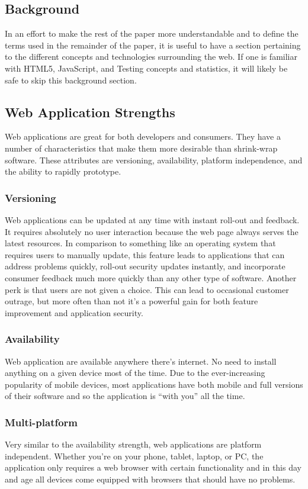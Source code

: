 \documentclass[11pt]{article}
\begin{document}
\begin{multicols}{2}
\section{Background}
In an effort to make the rest of the paper more understandable and to define the terms used in the remainder of the paper, it is useful to have a section pertaining to the different concepts and technologies surrounding the web.
If one is familiar with HTML5, JavaScript, and Testing concepts and statistics, it will likely be safe to skip this background section.

\subsection{Web Application Strengths}
Web applications are great for both developers and consumers. They have a number of characteristics that make them more desirable than shrink-wrap software. These attributes are versioning, availability, platform independence, and the ability to rapidly prototype.

\subsubsection{Versioning}
Web applications can be updated at any time with instant roll-out and feedback. It requires absolutely no user interaction because the web page always serves the latest resources. In comparison to something like an operating system that requires users to manually update, this feature leads to applications that can address problems quickly, roll-out security updates instantly, and incorporate consumer feedback much more quickly than any other type of software. Another perk is that users are not given a choice. This can lead to occasional customer outrage, but more often than not it's a powerful gain for both feature improvement and application security.

\subsubsection{Availability}
Web application are available anywhere there's internet. No need to install anything on a given device most of the time. Due to the ever-increasing popularity of mobile devices, most applications have both mobile and full versions of their software and so the application is ``with you'' all the time.

\subsubsection{Multi-platform}
Very similar to the availability strength, web applications are platform independent. Whether you're on your phone, tablet, laptop, or PC, the application only requires a web browser with certain functionality and in this day and age all devices come equipped with browsers that should have no problems.


\end{multicols}
\end{document}
